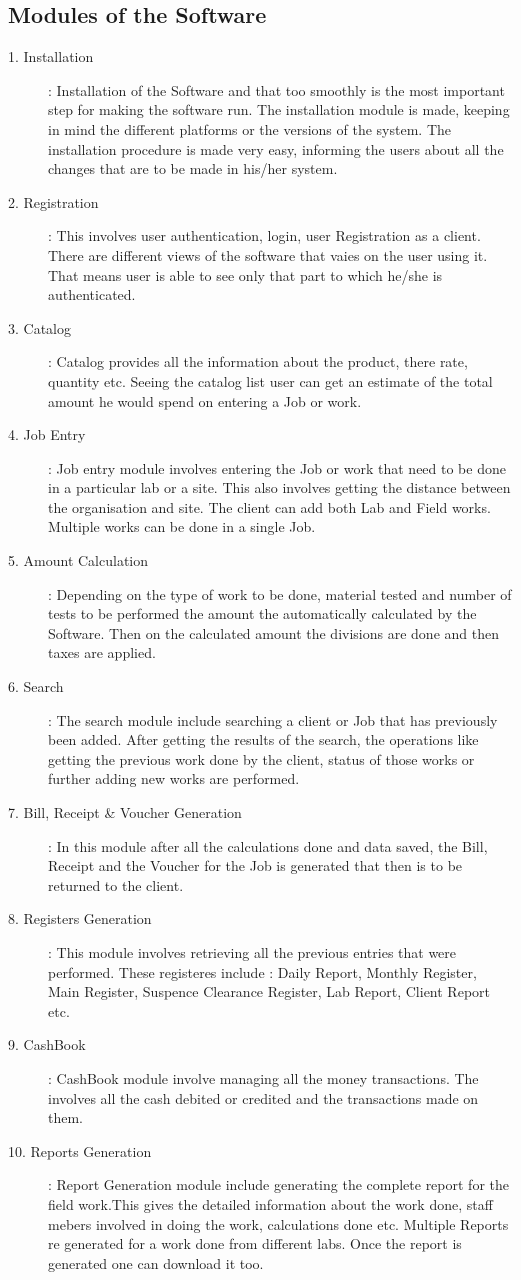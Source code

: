 \subsection{Modules of the Software}
\begin{description}
\item[1. Installation] : Installation of the Software and that too smoothly is the most important step for making the software run. The installation module is made, keeping in mind the different platforms or the versions of the system. The installation procedure is made very easy, informing the users about all the changes that are to be made in his/her system.
\item[2. Registration] : This involves user authentication, login, user Registration as a client. There are different views of the software that vaies on the user using it. That means user is able to see only that part to which he/she is authenticated.
\item[3. Catalog] : Catalog provides all the information about the product, there rate, quantity etc. Seeing the catalog list user can get an estimate of the total amount he would spend on entering a Job or work.
\item[4. Job Entry] : Job entry module involves entering the Job or work that need to be done in a particular lab or a site. This also involves getting the distance between the organisation and site. The client can add both Lab and Field works. Multiple works can be done in a single Job. 
\item[5. Amount Calculation] : Depending on the type of work to be done, material tested and number of tests to be performed the amount the automatically calculated by the Software. Then on the calculated amount the divisions are done and then taxes are applied.
\item[6. Search] : The search module include searching a client or Job that has previously been added. After getting the results of the search, the operations like getting the previous work done by the client, status of those works or further adding new works are performed. 
\item[7. Bill, Receipt \& Voucher Generation] : In this module after all the calculations done and data saved, the Bill, Receipt and the Voucher for the Job is generated that then is to be returned to the client.
\item[8. Registers Generation] : This module involves retrieving all the previous entries that were performed. These registeres include : Daily Report, Monthly Register, Main Register, Suspence Clearance Register, Lab Report, Client Report etc.
\item[9. CashBook] : CashBook module involve managing all the money transactions.  The involves all the cash debited or credited and the transactions made on them. 
\item[10. Reports Generation] : Report Generation module include generating the complete report for the field work.This gives the detailed information about the work done, staff mebers involved in doing the work, calculations done etc. Multiple Reports re generated for a work done from different labs. Once the report is generated one can download it too.
\end{description}
\newpage
